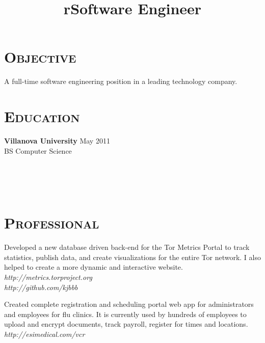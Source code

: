 \begin{resume}


\section{\textsc{Objective}}
A full-time software engineering position in a leading technology company.
\section{\textsc{Education}}

\textbf{Villanova University} \hfill May 2011 \\
BS Computer Science
\newline


\begin{formatb}
  \title{r}\\
  \\
  \body\\
\end{formatb}

\section{\textsc{Professional}}

\title{}
\begin{position}
Developed a new database driven back-end for the Tor Metrics Portal to track
statistics, publish data, and create visualizations for the entire Tor network.
I also helped to create a more dynamic and interactive website. \\
{\itshape http://metrics.torproject.org} \\
{\itshape http://github.com/kjbbb}
\end{position}

\title{Software Engineer}
\begin{position}
Created complete registration and scheduling portal web app for administrators
and employees for flu clinics. It is currently used by hundreds of employees to
upload and encrypt documents, track payroll, register for times and locations.
\\ {\itshape http://esimedical.com/vcr}
\end{position}


\end{resume}

